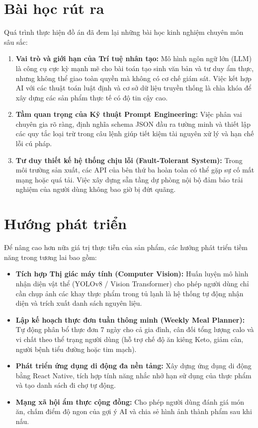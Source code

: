 \section{Bài học rút ra}

Quá trình thực hiện đồ án đã đem lại những bài học kinh nghiệm chuyên môn sâu sắc:
\begin{enumerate}[leftmargin=1.6em, itemsep=3pt]
  \item \textbf{Vai trò và giới hạn của Trí tuệ nhân tạo:} Mô hình ngôn ngữ lớn (LLM) là công cụ cực kỳ mạnh mẽ cho bài toán tạo sinh văn bản và tư duy ẩm thực, nhưng không thể giao toàn quyền mà không có cơ chế giám sát. Việc kết hợp AI với các thuật toán luật định  và cơ sở dữ liệu truyền thống là chìa khóa để xây dựng các sản phẩm thực tế có độ tin cậy cao.
  \item \textbf{Tầm quan trọng của Kỹ thuật Prompt Engineering:} Việc phân vai chuyên gia rõ ràng, định nghĩa schema JSON đầu ra tường minh và thiết lập các quy tắc loại trừ trong câu lệnh giúp tiết kiệm tài nguyên xử lý và hạn chế lỗi cú pháp.
  \item \textbf{Tư duy thiết kế hệ thống chịu lỗi (Fault-Tolerant System):} Trong môi trường sản xuất, các API của bên thứ ba hoàn toàn có thể gặp sự cố mất mạng hoặc quá tải. Việc xây dựng sẵn tầng dự phòng nội bộ  đảm bảo trải nghiệm của người dùng không bao giờ bị đứt quãng.
\end{enumerate}

\section{Hướng phát triển}

Để nâng cao hơn nữa giá trị thực tiễn của sản phẩm, các hướng phát triển tiềm năng trong tương lai bao gồm:
\begin{itemize}[leftmargin=1.6em, itemsep=2pt]
  \item \textbf{Tích hợp Thị giác máy tính (Computer Vision):} Huấn luyện mô hình nhận diện vật thể (YOLOv8 / Vision Transformer) cho phép người dùng chỉ cần chụp ảnh các khay thực phẩm trong tủ lạnh là hệ thống tự động nhận diện và trích xuất danh sách nguyên liệu.
  \item \textbf{Lập kế hoạch thực đơn tuần thông minh (Weekly Meal Planner):} Tự động phân bổ thực đơn 7 ngày cho cả gia đình, cân đối tổng lượng calo và vi chất theo thể trạng người dùng (hỗ trợ chế độ ăn kiêng Keto, giảm cân, người bệnh tiểu đường hoặc tim mạch).
  \item \textbf{Phát triển ứng dụng di động đa nền tảng:} Xây dựng ứng dụng di động bằng React Native, tích hợp tính năng nhắc nhở hạn sử dụng của thực phẩm và tạo danh sách đi chợ tự động.
  \item \textbf{Mạng xã hội ẩm thực cộng đồng:} Cho phép người dùng đánh giá món ăn, chấm điểm độ ngon của gợi ý AI và chia sẻ hình ảnh thành phẩm sau khi nấu.
\end{itemize}
